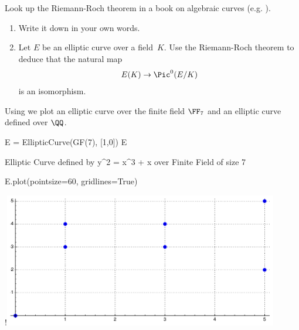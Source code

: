 \begin{exercise}
  Look up the Riemann-Roch theorem in a book on algebraic curves
  (e.g. \cite{hartshorne,liu2006algebraic}).
  \begin{enumerate}
    \item Write it down in your own words.
    \item Let $E$ be an elliptic curve over a field~$K$.
    Use the Riemann-Roch theorem to deduce that the natural map
    \[
      E(K) \to \Pic^0(E/K)
    \]
    is an isomorphism.
  \end{enumerate}
\end{exercise}

Using {\Sage} we plot an elliptic curve over the finite field $\FF_7$ and an
elliptic curve defined over $\QQ$.
\begin{sagecode} %
\begin{sagecell}
E = EllipticCurve(GF(7), [1,0])
E
\end{sagecell}
\begin{sageout}
Elliptic Curve defined by y^2 = x^3 + x over
Finite Field of size 7
\end{sageout}
\end{sagecode}
\begin{sagecode}
\begin{sagecell} %
E.plot(pointsize=60, gridlines=True)
\end{sagecell}
\begin{sageout}[escapechar=!]
!\includegraphics[width=0.9\textwidth]{img/ecmod7}
\end{sageout}
\end{sagecode}

